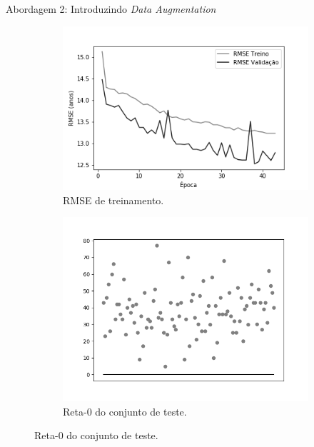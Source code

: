 \begin{frame}{Abordagem 2: Introduzindo \emph{Data Augmentation}}
\begin{figure}[h!]
  \caption{Resultados do treinamento e teste da CNN LeNet \emph{ReLU}.}
  \begin{subfigure}[hb]{0.4\textwidth}
    \caption{RMSE de treinamento.}
    \includegraphics[width=\linewidth]{img/graficos/history/lenet/fig-history-image-treat-2-lenet-relu-rmse.png}%
  \end{subfigure}%
  \begin{subfigure}[hb]{0.4\textwidth}
    \caption{Reta-0 do conjunto de teste.}
    \includegraphics[width=\linewidth]{img/graficos/reta0/lenet/fig-reta-0-image-treat-2-lenet-relu.png}%
  \end{subfigure}
\end{figure}
\end{frame}

